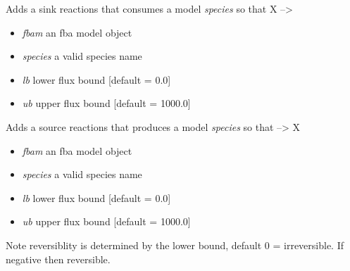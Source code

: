 \documentclass[a4paper,11pt,english]{sphinxmanual}
\begin{document}
\begin{fulllineitems}
\label{modules_doc:cbmpy.CBTools.addSinkReaction}
Adds a sink reactions that consumes a model \emph{species} so that X --\textgreater{}
\begin{itemize}
\item {} 
\emph{fbam} an fba model object

\item {} 
\emph{species} a valid species name

\item {} 
\emph{lb} lower flux bound {[}default = 0.0{]}

\item {} 
\emph{ub} upper flux bound {[}default = 1000.0{]}

\end{itemize}

\end{fulllineitems}


\begin{fulllineitems}
\label{modules_doc:cbmpy.CBTools.addSourceReaction}
Adds a source reactions that produces a model \emph{species} so that --\textgreater{} X
\begin{itemize}
\item {} 
\emph{fbam} an fba model object

\item {} 
\emph{species} a valid species name

\item {} 
\emph{lb} lower flux bound {[}default = 0.0{]}

\item {} 
\emph{ub} upper flux bound {[}default = 1000.0{]}

\end{itemize}

Note reversiblity is determined by the lower bound, default 0 = irreversible. If
negative then reversible.

\end{fulllineitems}

\end{document}
